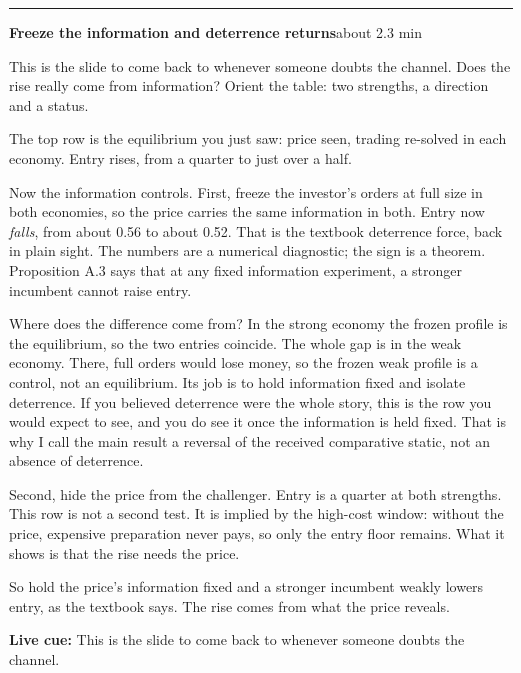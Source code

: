 \documentclass[11pt]{article}
\newcommand{\Cue}[1]{\par\nobreak\smallskip\noindent
  \textcolor{ScriptGray}{\footnotesize\textbf{Live cue:} #1}\par}
\newcommand{\scriptframe}[3]{%
  \Needspace{9\baselineskip}%
  \par\medskip\noindent\textcolor{ScriptBlue}{\rule{\linewidth}{0.55pt}}%
  \par\smallskip\noindent
  \textbf{#1}\hfill\textcolor{ScriptGray}{\small #2}\par\smallskip
  #3\par}
\begin{document}
\scriptframe{Freeze the information and deterrence returns}{about 2.3 min}{%
  This is the slide to come back to whenever someone doubts the channel. Does
  the rise really come from information? Orient the table: two strengths, a
  direction and a status.

  The top row is the equilibrium you just saw: price seen, trading re-solved in
  each economy. Entry rises, from a quarter to just over a half.

  Now the information controls. First, freeze the investor's orders at full
  size in both economies, so the price carries the same information in both.
  Entry now \emph{falls}, from about 0.56 to about 0.52.
  That is the textbook deterrence force, back in plain sight. The numbers are a
  numerical diagnostic; the sign is a theorem. Proposition A.3 says that at any
  fixed information experiment, a stronger incumbent cannot raise entry.

  Where does the difference come from? In the strong economy the frozen profile
  is the equilibrium, so the two entries coincide. The whole gap is in the weak
  economy. There, full orders would lose money, so the frozen weak profile is a
  control, not an equilibrium. Its job is to hold information fixed and isolate
  deterrence. If you believed deterrence were the whole story, this is the row
  you would expect to see, and you do see it once the information is held
  fixed. That is why I call the main result a reversal of the received
  comparative static, not an absence of deterrence.

  Second, hide the price from the challenger. Entry is a quarter at both
  strengths.
  This row is not a second test. It is implied by the high-cost window: without
  the price, expensive preparation never pays, so only the entry floor remains.
  What it shows is that the rise needs the price.

  So hold the price's information fixed and a stronger incumbent weakly lowers
  entry, as the textbook says. The rise comes from what the price reveals.
  \Cue{This is the slide to come back to whenever someone doubts the channel.}
}
\end{document}
